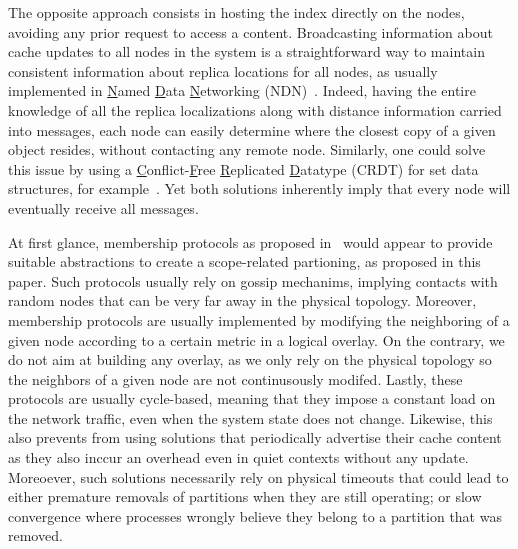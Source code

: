 The opposite approach consists in hosting the index directly on the nodes, avoiding any prior request to access a content.   
Broadcasting information about cache updates to all nodes in the system is a straightforward way to maintain consistent information about replica locations for all nodes, as usually implemented in \underline{N}amed \underline{D}ata \underline{N}etworking (NDN)~\cite{nlsr}.  Indeed, having the entire knowledge of all the replica localizations along with distance information carried into messages, each node can easily determine where the closest copy of a given object resides, without contacting any remote node.
Similarly, one could solve this issue by using a \underline{C}onflict-\underline{F}ree \underline{R}eplicated \underline{D}atatype (CRDT) for set data structures, for example~\cite{shapiro2011crdts}. Yet both solutions inherently imply that every node will eventually receive all messages. 


At first glance, membership protocols as proposed in~\cite{t-man} would appear to provide suitable abstractions to create a scope-related partioning, as proposed in this paper. Such protocols usually rely on gossip mechanims, implying contacts with random nodes that can be very far away in the physical topology. Moreover, membership protocols are usually implemented  by modifying the neighboring of a given node according to a certain metric in a logical overlay.
On the contrary, we do not aim at building any overlay, as we only rely on the physical topology so the neighbors of a given node are not continusously modifed. Lastly, these protocols are usually cycle-based, meaning that they impose a constant load on the network traffic, even when the system state does not change. Likewise, this also prevents from using solutions that periodically advertise their cache content~\cite{garcia-lopez, hemmati2015namebased} as they also inccur an overhead even in quiet contexts without any update. 
Moreoever, such solutions necessarily rely on physical timeouts that could lead to either premature removals of partitions when they are still operating; or slow convergence where processes wrongly believe they belong to a partition that was removed. 



